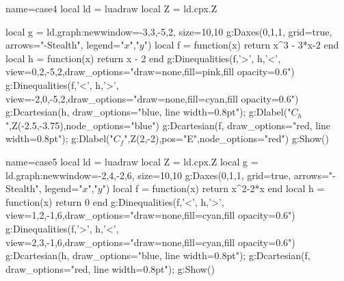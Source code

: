 \documentclass[border=2 mm]{standalone}
\begin{document}
\begin{luadraw}{name=case4}
local ld = luadraw
local Z = ld.cpx.Z

local g = ld.graph:new{window={-3,3,-5,2}, size={10,10}}
g:Daxes({0,1,1}, {grid=true, arrows="-Stealth", legend={"$x$","$y$"}})
local f = function(x) return x^3 - 3*x-2 end
local h = function(x) return x - 2 end
g:Dinequalities({f,'>', h,'<'}, {view={0,2,-5,2},draw_options="draw=none,fill=pink,fill opacity=0.6"})
g:Dinequalities({f,'<', h,'>'}, {view={-2,0,-5,2},draw_options="draw=none,fill=cyan,fill opacity=0.6"})
g:Dcartesian(h, {draw_options="blue, line width=0.8pt"}); g:Dlabel("$C_h$",Z(-2.5,-3.75),{node_options="blue"})
g:Dcartesian(f, {draw_options="red, line width=0.8pt"}); g:Dlabel("$C_f$",Z(2,-2),{pos="E",node_options="red"})
g:Show()
\end{luadraw}

\begin{luadraw}{name=case5}
local ld = luadraw
local Z = ld.cpx.Z
local g = ld.graph:new{window={-2,4,-2,6}, size={10,10}}
g:Daxes({0,1,1}, {grid=true, arrows="-Stealth", legend={"$x$","$y$"}})
local f = function(x) return x^2-2*x end
local h = function(x) return 0 end
g:Dinequalities({f,'<', h,'>'}, {view={1,2,-1,6},draw_options="draw=none,fill=cyan,fill opacity=0.6"})
g:Dinequalities({f,'>', h,'<'}, {view={2,3,-1,6},draw_options="draw=none,fill=cyan,fill opacity=0.6"})
g:Dcartesian(h, {draw_options="blue, line width=0.8pt"}); 
g:Dcartesian(f, {draw_options="red, line width=0.8pt"}); 
g:Show()
\end{luadraw}
\end{document}
